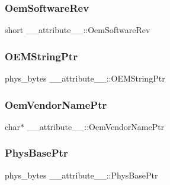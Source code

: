 \subsubsection{\texorpdfstring{Oem\+Software\+Rev}{OemSoftwareRev}}
{\footnotesize\ttfamily short \+\_\+\+\_\+attribute\+\_\+\+\_\+\+::\+Oem\+Software\+Rev}

\hypertarget{struct____attribute_____a6412609805e1bc6e48f7743a48dc841a}{}\label{struct____attribute_____a6412609805e1bc6e48f7743a48dc841a} 
\subsubsection{\texorpdfstring{O\+E\+M\+String\+Ptr}{OEMStringPtr}}
{\footnotesize\ttfamily phys\+\_\+bytes \+\_\+\+\_\+attribute\+\_\+\+\_\+\+::\+O\+E\+M\+String\+Ptr}

\hypertarget{struct____attribute_____af0c799aee5a7aa7a1514217508e3f3ed}{}\label{struct____attribute_____af0c799aee5a7aa7a1514217508e3f3ed} 
\subsubsection{\texorpdfstring{Oem\+Vendor\+Name\+Ptr}{OemVendorNamePtr}}
{\footnotesize\ttfamily char$\ast$ \+\_\+\+\_\+attribute\+\_\+\+\_\+\+::\+Oem\+Vendor\+Name\+Ptr}

\hypertarget{struct____attribute_____a852a4f68cfbabf08df197128e137bde6}{}\label{struct____attribute_____a852a4f68cfbabf08df197128e137bde6} 
\subsubsection{\texorpdfstring{Phys\+Base\+Ptr}{PhysBasePtr}}
{\footnotesize\ttfamily phys\+\_\+bytes \+\_\+\+\_\+attribute\+\_\+\+\_\+\+::\+Phys\+Base\+Ptr}



